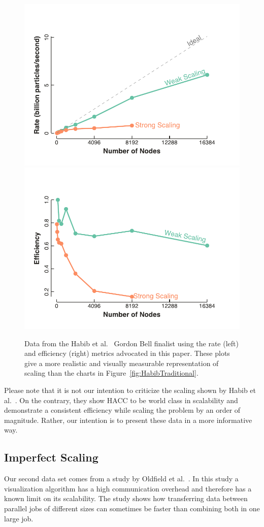 \documentclass{llncs}
\newcommand*{\scite}[1]{~\cite{#1}}
\newcommand{\etal}{et al.\xspace}
\begin{document}
\begin{figure}[htb]
  \centering
  \includegraphics[width=.48\linewidth]{images/HabibRate}\quad
  \includegraphics[width=.48\linewidth]{images/HabibEfficiency}
  \caption{Data from the Habib \etal\scite{Habib2013} Gordon Bell finalist
    using the rate (left) and efficiency (right) metrics advocated in this
    paper. These plots give a more realistic and visually measurable
    representation of scaling than the charts in
    Figure~\ref{fig:HabibTraditional}.}
  \label{fig:HabibBetter}
\end{figure}

Please note that it is not our intention to criticize the scaling shown by
Habib \etal\scite{Habib2013}. On the contrary, they show HACC to be world
class in scalability and demonstrate a consistent efficiency while scaling
the problem by an order of magnitude. Rather, our intention is to present
these data in a more informative way.

\subsection{Imperfect Scaling}

\noindent
Our second data set comes from a study by Oldfield
\etal\scite{Oldfield2014,Rogers2013}. In this study a visualization
algorithm has a high communication overhead and therefore has a known limit
on its scalability. The study shows how transferring data between parallel
jobs of different sizes can sometimes be faster than combining both in one
large job.
\end{document}
